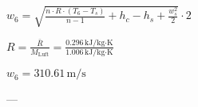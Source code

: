 \( w_6 = \sqrt{\frac{n \cdot R \cdot (T_6 - T_s)}{n - 1} + h_c - h_s + \frac{w_s^2}{2}} \cdot 2 \)  

\( R = \frac{\bar{R}}{M_{\text{Luft}}} = \frac{0.296 \, \text{kJ/kg·K}}{1.006 \, \text{kJ/kg·K}} \)  

\( w_6 = 310.61 \, \text{m/s} \)  

---